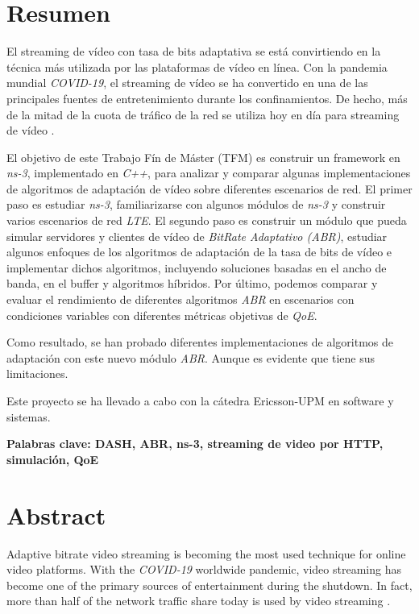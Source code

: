 \cleardoublepage
{}
\chapter*{Resumen}

El streaming de vídeo con tasa de bits adaptativa se está convirtiendo 
en la técnica más utilizada por las plataformas de vídeo en línea. 
Con la pandemia mundial \textit{COVID-19}, el streaming de vídeo se ha convertido 
en una de las principales fuentes de entretenimiento durante los confinamientos. 
De hecho, más de la mitad de la cuota de tráfico de la red se utiliza hoy en 
día para streaming de vídeo \cite{sandvine1}.

El objetivo de este Trabajo Fín de Máster (TFM) es construir un framework en \textit{ns-3},
implementado en \textit{C++}, para analizar y comparar algunas implementaciones de algoritmos de adaptación de vídeo
sobre diferentes escenarios de red. El primer paso 
es estudiar \textit{ns-3}, familiarizarse con algunos módulos de \textit{ns-3} y construir varios 
escenarios de red \textit{LTE}. El segundo paso es construir un módulo que pueda simular 
servidores y clientes de vídeo de \textit{BitRate Adaptativo (ABR)}, estudiar algunos enfoques de los algoritmos
de adaptación de la tasa de bits de vídeo e implementar dichos algoritmos, 
incluyendo soluciones basadas en el ancho de banda, en el buffer y algoritmos 
híbridos. 
Por último, podemos comparar y evaluar el rendimiento de diferentes algoritmos 
\textit{ABR} en escenarios con condiciones variables con diferentes métricas objetivas 
de \textit{QoE}.

Como resultado, se han probado diferentes implementaciones de algoritmos de adaptación con
este nuevo módulo \textit{ABR}. Aunque es evidente que tiene sus limitaciones.

Este proyecto se ha llevado a cabo con la cátedra Ericsson-UPM en software y sistemas.



\vfill
\textbf{Palabras clave: DASH, ABR, ns-3, streaming de video por HTTP, simulación, QoE} 


\cleardoublepage
{}
\chapter*{Abstract}

Adaptive bitrate video streaming is becoming the most used technique for online
video platforms. With the \textit{COVID-19} worldwide pandemic, video streaming has become
one of the primary sources of entertainment during the shutdown. In fact, more
than half of the network traffic share today is used by video streaming \cite{sandvine1}.

